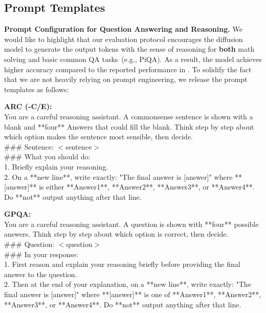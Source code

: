 \subsection{Prompt Templates}\label{sec:app-prompts}
\textbf{Prompt Configuration for Question Answering and Reasoning.}
We would like to highlight that our evaluation protocol encourages the diffusion model to generate the output tokens with the sense of reasoning for \textbf{both} math solving and basic common QA tasks~(e.g., PiQA). As a result, the model achieves higher accuracy compared to the reported performance in \cite{dream2025}. To solidify the fact that we are not heavily relying on prompt engineering, we release the prompt templates as follows:




\medskip
\begin{tcolorbox}[colback=gray!5, colframe=gray!50, boxrule=0.5pt, arc=2pt]
\textbf{ARC (-C/E):}\\

You are a careful reasoning assistant.  
A commonsense sentence is shown with a blank and **four** Answers that could fill the blank.  
Think step by step about which option makes the sentence most sensible, then decide.\\

\#\#\# Sentence:  
$<$sentence$>$ \\

\#\#\# What you should do:  \\
1. Briefly explain your reasoning.  \\
2. On a **new line**, write exactly:  
   "The final answer is [answer]"  
   where **[answer]** is either **Answer1**, **Answer2**, **Answer3**, or **Answer4**.  
Do **not** output anything after that line.
\end{tcolorbox}

\medskip
\begin{tcolorbox}[colback=gray!5, colframe=gray!50, boxrule=0.5pt, arc=2pt]
\textbf{GPQA:}\\

You are a careful reasoning assistant.  
A question is shown with **four** possible answers.  
Think step by step about which option is correct, then decide. \\

\#\#\# Question: $<$question$>$ \\

\#\#\# In your response:  \\
1. First reason and explain your reasoning briefly before providing the final answer to the question.  \\
2. Then at the end of your explanation, on a **new line**, write exactly:  
   "The final answer is [answer]"  
   where **[answer]** is one of **Answer1**, **Answer2**, **Answer3**, or **Answer4**.  
Do **not** output anything after that line.
\end{tcolorbox}

